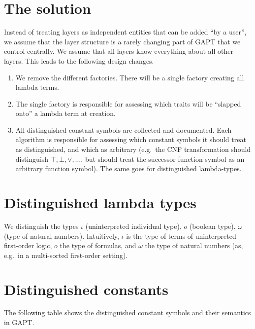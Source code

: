 \documentclass[11pt,a4paper]{article}
\newcommand{\omicron}{o}
\newcommand{\ftype}{\omicron}
\newcommand{\itype}{\iota}
\newcommand{\atype}{\omega}
\begin{document}
\section{The solution}
%
Instead of treating layers as independent entities that can be added ``by a user'', we assume that the
layer structure is a rarely changing part of GAPT that we control centrally. We assume that
all layers know everything about all other layers. This leads to the following design changes.
%
\begin{enumerate}
  \item We remove the different factories. There will be a single factory creating all lambda terms.
  \item The single factory is responsible for assessing which traits will be ``slapped onto'' a lambda
    term at creation.
  \item All distinguished constant symbols are collected and documented. Each algorithm is responsible
    for assessing which constant symbols it should treat as distinguished, and which as arbitrary (e.g.~the
    CNF transformation should distinguish $\top,\bot,\lor, \ldots$, but should treat the successor function
    symbol as an arbitrary function symbol). The same goes for distinguished lambda-types.
\end{enumerate}
%
\section{Distinguished lambda types}
%
We distinguish the types $\itype$ (uninterpreted individual type), $\ftype$ (boolean type),
$\atype$ (type of natural numbers). Intuitively, $\itype$ is the type of terms of uninterpreted
first-order logic, $\ftype$ the type of formulas, and $\atype$ the type of natural numbers (as, e.g.~in
a multi-sorted first-order setting).
%
\section{Distinguished constants}
%
The following table shows the distinguished constant symbols and their semantics in GAPT.

\vskip 0.3cm
\end{document}
